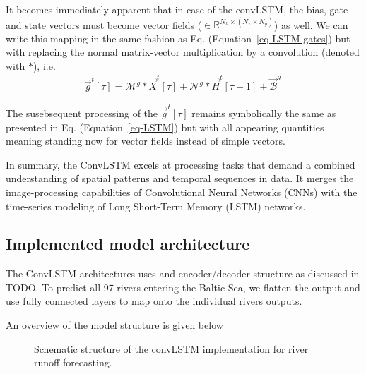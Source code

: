 \documentclass[
]{agujournal2019}
\begin{document}
It becomes immediately apparent that in case of the convLSTM, the bias,
gate and state vectors must become vector fields
(\(\in \mathbb{R}^{N_h \times (N_x \times N_y)}\)) as well. We can write
this mapping in the same fashion as Eq. (Equation~\ref{eq-LSTM-gates})
but with replacing the normal matrix-vector multiplication by a
convolution (denoted with \(\ast\)), i.e.\\
\[
\begin{aligned}
\vec{g}^t[\tau] = \pmb{\mathcal{M}}^{g} \ast \vec{X}^t[\tau] + \pmb{\mathcal{N}}^{g} \ast  \vec{H}^t[ \tau-1]+ \vec{\mathcal{B}}^g \,
\end{aligned}
\]

The susebsequent processing of the \(\vec{g}^t[\tau]\) remains
symbolically the same as presented in Eq. (Equation~\ref{eq-LSTM}) but
with all appearing quantities meaning standing now for vector fields
instead of simple vectors.

In summary, the ConvLSTM excels at processing tasks that demand a
combined understanding of spatial patterns and temporal sequences in
data. It merges the image-processing capabilities of Convolutional
Neural Networks (CNNs) with the time-series modeling of Long Short-Term
Memory (LSTM) networks.

\subsection{Implemented model
architecture}\label{implemented-model-architecture}

The ConvLSTM architectures uses and encoder/decoder structure as
discussed in TODO. To predict all 97 rivers entering the Baltic Sea, we
flatten the output and use fully connected layers to map onto the
individual rivers outputs.

An overview of the model structure is given below

\begin{figure}


\caption{\label{fig-baltNet}Schematic structure of the convLSTM
implementation for river runoff forecasting.}

\end{figure}%
\end{document}
